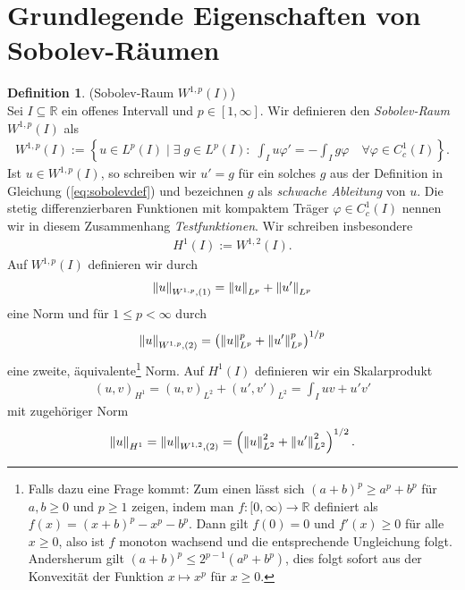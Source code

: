 \documentclass[twoside]{article}
\theoremstyle{definition}
\newtheorem{definition}[theorem]{Definition}
\begin{document}
\section{Grundlegende Eigenschaften von Sobolev-Räumen}
\begin{definition}(Sobolev-Raum $W^{1,p}(I)$)\\
Sei $I \subseteq \mathbb{R}$ ein offenes Intervall und $p \in [1,\infty]$. Wir definieren den \textit{Sobolev-Raum} $W^{1,p}(I)$ als
\begin{align}
W^{1,p}(I) := \left\{u \in L^p(I) \; \mathrel{\Big|} \; \exists \; g \in L^p(I): \; \int_I u \varphi' = - \int_I g \varphi \quad \forall \varphi \in C_c^1(I) \right\}. \label{eq:sobolevdef}
\end{align}
Ist $u \in W^{1,p}(I)$, so schreiben wir $u' = g$ für ein solches $g$ aus der Definition in Gleichung (\ref{eq:sobolevdef}) und bezeichnen $g$ als \textit{schwache Ableitung} von $u$. Die stetig differenzierbaren Funktionen mit kompaktem Träger $\varphi \in C_c^1(I)$ nennen wir in diesem Zusammenhang \textit{Testfunktionen}. Wir schreiben insbesondere
\begin{align}
H^1(I) := W^{1,2}(I).
\end{align}
Auf $W^{1,p}(I)$ definieren wir durch
\begin{align}
\norm{u}_{W^{1,p},(1)} = \norm{u}_{L^p} +  \norm{u'}_{L^p}
\end{align}
eine Norm und für $1 \leq p < \infty$ durch
\begin{align}
\norm{u}_{W^{1,p},(2)} = \left(\norm{u}_{L^p}^p +  \norm{u'}_{L^p}^p\right)^{1/p}
\end{align}
eine zweite, äquivalente\footnote{Falls dazu eine Frage kommt: Zum einen lässt sich $(a+b)^p \geq a^p + b^p$ für $a,b \geq 0$ und $p \geq 1$ zeigen, indem man $f:[0,\infty) \to \mathbb{R}$ definiert als $f(x)=(x+b)^p -x^p - b^p$. Dann gilt $f(0)=0$ und $f'(x) \geq 0$ für alle $x \geq 0$, also ist $f$ monoton wachsend und die entsprechende Ungleichung folgt. Andersherum gilt $(a+b)^p \leq 2^{p-1} (a^p + b^p)$, dies folgt sofort aus der Konvexität der Funktion $x \mapsto x^p$ für $x \geq 0$.} Norm. Auf $H^1(I)$ definieren wir ein Skalarprodukt
\begin{align}
(u,v)_{H^1} = (u,v)_{L^2} + (u',v')_{L^2} = \int_I uv + u'v'
\end{align}
mit zugehöriger Norm
\begin{align}
\norm{u}_{H^1} = \norm{u}_{W^{1,2},(2)} = \left(\norm{u}_{L^2}^2 + \norm{u'}_{L^2}^2 \right)^{1/2}.
\end{align}
\end{definition}
\end{document}
